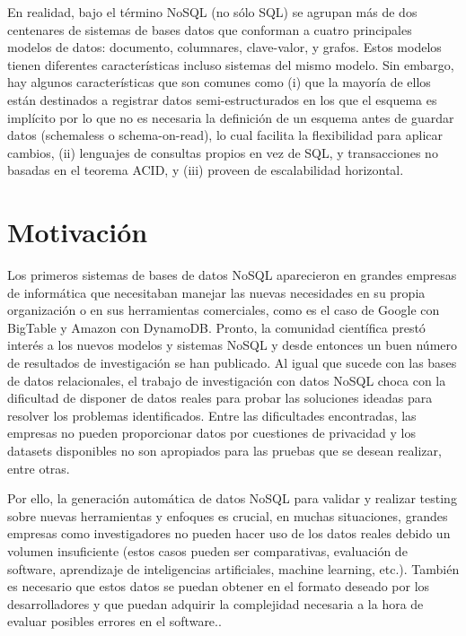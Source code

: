En realidad, bajo el término NoSQL (no sólo SQL) se agrupan más de dos centenares de sistemas de bases datos que conforman a cuatro principales modelos de datos: documento, columnares, clave-valor, y grafos. Estos modelos tienen diferentes características incluso sistemas del mismo modelo. Sin embargo, hay algunos características que son comunes como (i)  que la mayoría de ellos están destinados a registrar datos semi-estructurados en los que el esquema es implícito por lo que no es necesaria la definición de un esquema antes de guardar datos (schemaless o schema-on-read), lo cual facilita la flexibilidad para aplicar cambios, (ii) lenguajes de consultas propios en vez de SQL, y transacciones no basadas en el teorema ACID, y (iii) proveen de escalabilidad horizontal.



\section{Motivación\label{01intro_motivacion}}


Los primeros sistemas de bases de datos NoSQL aparecieron en grandes empresas de informática que necesitaban manejar las nuevas necesidades en su propia organización o en sus herramientas comerciales, como es el caso de Google con BigTable y Amazon con DynamoDB. Pronto, la comunidad científica prestó interés a los nuevos modelos y sistemas NoSQL y desde entonces un buen número de resultados de investigación se han publicado. Al igual que sucede con las bases de datos relacionales, el trabajo de investigación con datos NoSQL choca con la dificultad de disponer de datos reales para probar las soluciones ideadas para resolver los problemas identificados. Entre las dificultades encontradas, las empresas no pueden proporcionar datos por cuestiones de privacidad y los datasets disponibles no son apropiados para las pruebas que se desean realizar, entre otras. 

Por ello, la generación automática de datos NoSQL para validar y realizar testing sobre nuevas herramientas y enfoques es crucial, en muchas situaciones, grandes empresas como investigadores no pueden hacer uso de los datos reales debido un volumen insuficiente (estos casos pueden ser comparativas, evaluación de software, aprendizaje de inteligencias artificiales, machine learning, etc.). También es necesario que estos datos se puedan obtener en el formato deseado por los desarrolladores y que puedan adquirir la complejidad necesaria a la hora de evaluar posibles errores en el software..

